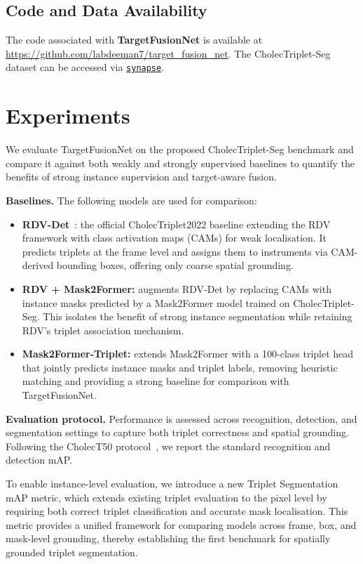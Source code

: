 \documentclass[pdflatex,sn-mathphys-num]{sn-jnl}%
\theoremstyle{thmstyleone}%
\theoremstyle{thmstyletwo}%
\theoremstyle{thmstylethree}%
\begin{document}
\subsection{Code and Data Availability}
The code associated with \textbf{TargetFusionNet} is available at 
\url{https://github.com/labdeeman7/target_fusion_net}.  
The CholecTriplet-Seg dataset can be accessed via 
\href{https://www.synapse.org/Synapse:syn70771321/datasets/}{\texttt{synapse}}.


\section{Experiments}\label{sec:experiments}
We evaluate TargetFusionNet on the proposed CholecTriplet-Seg benchmark and compare it against both weakly and strongly supervised baselines to quantify the benefits of strong instance supervision and target-aware fusion.  

\noindent\textbf{Baselines.}
The following models are used for comparison:
\begin{itemize}
    \item \textbf{RDV-Det}~\cite{nwoye2023cholectriplet2022_tfn}: the official CholecTriplet2022 baseline extending the RDV framework with class activation maps (CAMs) for weak localisation. It predicts triplets at the frame level and assigns them to instruments via CAM-derived bounding boxes, offering only coarse spatial grounding.  
    \item \textbf{RDV + Mask2Former:} augments RDV-Det by replacing CAMs with instance masks predicted by a Mask2Former model trained on CholecTriplet-Seg. This isolates the benefit of strong instance segmentation while retaining RDV’s triplet association mechanism.  
    \item \textbf{Mask2Former-Triplet:} extends Mask2Former with a 100-class triplet head that jointly predicts instance masks and triplet labels, removing heuristic matching and providing a strong baseline for comparison with TargetFusionNet.  
\end{itemize}


\noindent\textbf{Evaluation protocol.}
Performance is assessed across recognition, detection, and segmentation settings to capture both triplet correctness and spatial grounding. Following the CholecT50 protocol~\cite{nwoye2023datasplitsmetricsmethod}, we report the standard recognition and detection mAP. 

To enable instance-level evaluation, we introduce a new Triplet Segmentation mAP metric, which extends existing triplet evaluation to the pixel level by requiring both correct triplet classification and accurate mask localisation. This metric provides a unified framework for comparing models across frame, box, and mask-level grounding, thereby establishing the first benchmark for spatially grounded triplet segmentation.
\end{document}
